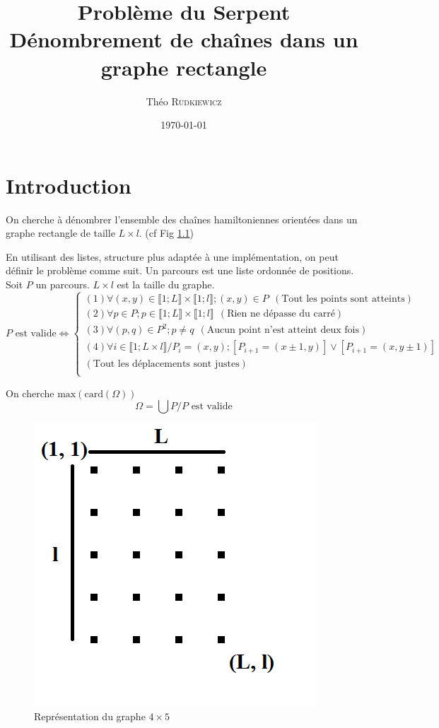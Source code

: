 \documentclass[twoside, a4paper, 12pt]{report}
\title{Problème du Serpent \\ Dénombrement de chaînes dans un graphe rectangle}
\author{Théo \textsc{Rudkiewicz} }
\date{\today}
\begin{document}

\newpage
\null
\thispagestyle{empty}
\newpage
\maketitle
{}


\chapter{Introduction}

On cherche à dénombrer l'ensemble des chaînes hamiltoniennes orientées dans un graphe rectangle de taille $L \times l$. (cf Fig \ref{graphe_4_5})

En utilisant des listes, structure plus adaptée à une implémentation, on peut définir le problème comme suit.
Un parcours est une liste ordonnée de positions. Soit $P$ un parcours. $L \times l$ est la taille du graphe.
\[
P \text{ est valide} \Longleftrightarrow
\left\{
    \begin{array}{ll}
        (1) \forall (x, y) \in \llbracket 1; L \rrbracket \times \llbracket 1; l \rrbracket; (x, y) \in P\ \ (\text{Tout les points sont atteints})\\
        (2) \forall p \in P; p \in \llbracket 1; L \rrbracket \times \llbracket 1; l \rrbracket\ \   (\text{Rien ne dépasse du carré})\\
	    (3) \forall (p, q) \in P^2; p \ne q\ \  (\text{Aucun point n'est atteint deux fois})\\
        (4) \forall i \in \llbracket 1; L \times l \rrbracket / P_i = (x, y);  [P_{i+1} = (x \pm 1, y)] \lor[P_{i+1} = (x, y\pm1)] \\(\text{Tout les déplacements sont justes})\\
    \end{array}
\right.
\]

On cherche $\text{max}(\text{card}(\Omega))$
\[ \Omega = \bigcup P / P\text{ est valide} \]

\begin{figure}[h]
\centering\includegraphics[scale=0.7]{graphe(4_5)_2.png}
\caption{Représentation du graphe  $4 \times 5$}
\label{graphe_4_5}
\end{figure}
\end{document}
